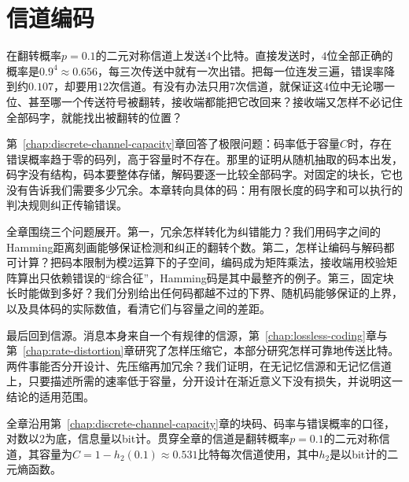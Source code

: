 \chapter{信道编码}
\label{chap:channel-codes}

在翻转概率$p=0.1$的二元对称信道上发送$4$个比特。直接发送时，$4$位全部正确的概率是$0.9^4\approx0.656$，每三次传送中就有一次出错。把每一位连发三遍，错误率降到约$0.107$，却要用$12$次信道。有没有办法只用$7$次信道，就保证这$4$位中无论哪一位、甚至哪一个传送符号被翻转，接收端都能把它改回来？接收端又怎样不必记住全部码字，就能找出被翻转的位置？

第~\ref{chap:discrete-channel-capacity}章回答了极限问题：码率低于容量$C$时，存在错误概率趋于零的码列，高于容量时不存在。那里的证明从随机抽取的码本出发，码字没有结构，码本要整体存储，解码要逐一比较全部码字。对固定的块长，它也没有告诉我们需要多少冗余。本章转向具体的码：用有限长度的码字和可以执行的判决规则纠正传输错误。

全章围绕三个问题展开。第一，冗余怎样转化为纠错能力？我们用码字之间的Hamming距离刻画能够保证检测和纠正的翻转个数。第二，怎样让编码与解码都可计算？把码本限制为模$2$运算下的子空间，编码成为矩阵乘法，接收端用校验矩阵算出只依赖错误的“综合征”，Hamming码是其中最整齐的例子。第三，固定块长时能做到多好？我们分别给出任何码都越不过的下界、随机码能够保证的上界，以及具体码的实际数值，看清它们与容量之间的差距。

最后回到信源。消息本身来自一个有规律的信源，第~\ref{chap:lossless-coding}章与第~\ref{chap:rate-distortion}章研究了怎样压缩它，本部分研究怎样可靠地传送比特。两件事能否分开设计、先压缩再加冗余？我们证明，在无记忆信源和无记忆信道上，只要描述所需的速率低于容量，分开设计在渐近意义下没有损失，并说明这一结论的适用范围。

全章沿用第~\ref{chap:discrete-channel-capacity}章的块码、码率与错误概率的口径，对数以$2$为底，信息量以bit计。贯穿全章的信道是翻转概率$p=0.1$的二元对称信道，其容量为$C=1-h_2(0.1)\approx0.531$比特每次信道使用，其中$h_2$是以bit计的二元熵函数。














